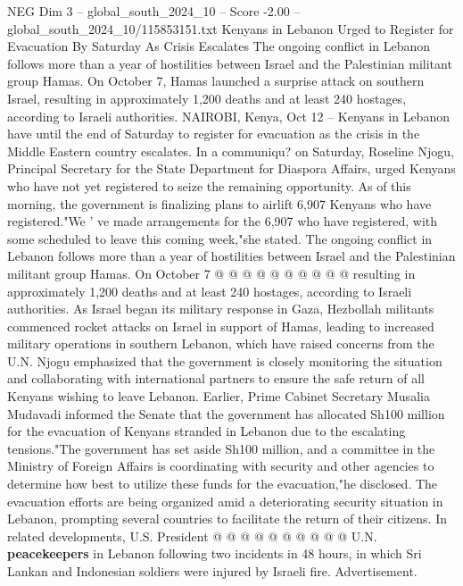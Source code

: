 \begin{textsample}{NEG Dim 3 – global\_south\_2024\_10 – Score -2.00 – global\_south\_2024\_10/115853151.txt}  \label{ex:f3_neg_093}
Kenyans in Lebanon Urged to Register for Evacuation By Saturday As Crisis Escalates The ongoing conflict in Lebanon follows more than a year of hostilities between Israel and the Palestinian militant group Hamas.
On October 7, Hamas launched a surprise attack on southern Israel, resulting in approximately 1,200 deaths and at least 240 hostages, according to Israeli authorities.
NAIROBI, Kenya, Oct 12 -- Kenyans in Lebanon have until the end of Saturday to register for evacuation as the crisis in the Middle Eastern country escalates.
In a communiqu? on Saturday, Roseline Njogu, Principal Secretary for the State Department for Diaspora Affairs, urged Kenyans who have not yet registered to seize the remaining opportunity.
As of this morning, the government is finalizing plans to airlift 6,907 Kenyans who have registered."We ' ve made arrangements for the 6,907 who have registered, with some scheduled to leave this coming week,"she stated.
The ongoing conflict in Lebanon follows more than a year of hostilities between Israel and the Palestinian militant group Hamas.
On October 7 @ @ @ @ @ @ @ @ @ @ resulting in approximately 1,200 deaths and at least 240 hostages, according to Israeli authorities.
As Israel began its military response in Gaza, Hezbollah militants commenced rocket attacks on Israel in support of Hamas, leading to increased military operations in southern Lebanon, which have raised concerns from the U.N.
Njogu emphasized that the government is closely monitoring the situation and collaborating with international partners to ensure the safe return of all Kenyans wishing to leave Lebanon.
Earlier, Prime Cabinet Secretary Musalia Mudavadi informed the Senate that the government has allocated Sh100 million for the evacuation of Kenyans stranded in Lebanon due to the escalating tensions."The government has set aside Sh100 million, and a committee in the Ministry of Foreign Affairs is coordinating with security and other agencies to determine how best to utilize these funds for the evacuation,"he disclosed.
The evacuation efforts are being organized amid a deteriorating security situation in Lebanon, prompting several countries to facilitate the return of their citizens.
In related developments, U.S.
President @ @ @ @ @ @ @ @ @ @ U.N. \textbf{peacekeepers} in Lebanon following two incidents in 48 hours, in which Sri Lankan and Indonesian soldiers were injured by Israeli fire.
Advertisement.

\end{textsample}

